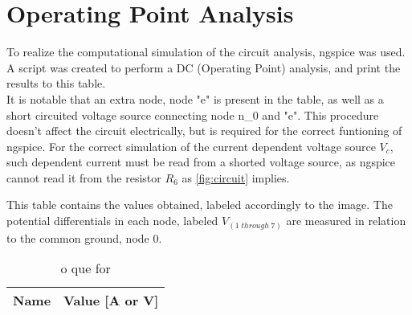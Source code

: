 \section{Operating Point Analysis}
\label{sec:simulation}

To realize the computational simulation of the circuit analysis, ngspice was used. A script was created to perform a DC (Operating Point) analysis, and print the results to this table.\\
It is notable that an extra node, node "e" is present in the table, as well as a short circuited voltage source connecting node n\_0 and "e". This procedure doesn't affect the circuit electrically, but is required for the correct funtioning of ngspice. For the correct simulation of the current dependent voltage source $V_{c}$, such dependent current must be read from a shorted voltage source, as ngspice cannot read it from the resistor $R_{6}$ as \ref{fig:circuit} implies.

This table contains the values obtained, labeled accordingly to the image. The potential differentials in each node, labeled $V_{(1 \; through \; 7)}$ are measured in relation to the common ground, node 0. 

\begin{table}[h]
  \centering
  \begin{tabular}{|l|r|}
    \hline    
    {\bf Name} & {\bf Value [A or V]} \\ \hline
    
  \end{tabular}
  \caption{o que for}
  \label{tab:op}
\end{table}



